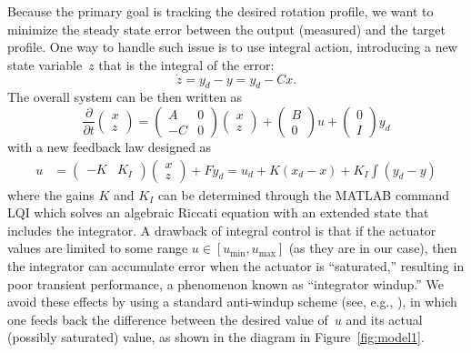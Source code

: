 \documentclass[12pt,lot, lof]{puthesis}
\begin{document}
Because the primary goal is tracking the desired rotation profile, we want to minimize the steady state error between the output (measured) and the target profile. One way to handle such issue is to use integral action, introducing a new state variable~$z$ that is the integral of the error:
\begin{equation}
	\dot{z} = y_{d} - y = y_{d} - C x.
	\label{integral}
\end{equation}
The overall system can be then written as
\begin{equation}
\frac{\partial}{\partial t}   \left( \begin{array}{c}  x \\ z \end{array}\right)
  ={ \left( \begin{array}{cc} A  & 0 \\ -C & 0 \end{array}  \right)} \left( \begin{array}{c} x \\ z    \end{array}  \right) 
  + \left( \begin{array}{c} B   \\ 0    \end{array}  \right) u + \left( \begin{array}{c}  0 \\ I \end{array}\right) y_{d}
\label{int2}
\end{equation}
with a new feedback law designed as
\begin{align}
u &= \left(\begin{array}{cc}  -K & K_I\end{array}\right) \left(\begin{array}{c}  x \\ z \end{array}\right) + F y_{d} 
   = u_d + K (x_d - x) + K_I \int (y_d - y)
\end{align}
where the gains $K$ and $K_I$ can be determined through the MATLAB command LQI
which solves an algebraic Riccati equation with an extended state that includes the integrator.
A drawback of integral control is that if the actuator values are limited to some range $u\in[u_\text{min},u_\text{max}]$ (as they are in our case), then the integrator can accumulate error when the actuator is ``saturated,'' resulting in poor transient performance, a phenomenon known as ``integrator windup.''  We avoid these effects by using a standard anti-windup scheme (see, e.g., \cite{AandM, Lewis}), in which one feeds back the difference between the desired value of~$u$ and its actual (possibly saturated) value, as shown in the diagram in Figure~\ref{fig:model1}.  
\end{document}
